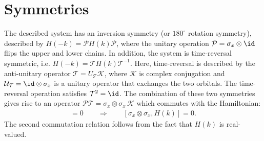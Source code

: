 \section{Symmetries}
The described system has an inversion symmetry (or $180^\circ$ rotation symmetry), described by $H(-k) = \mathcal{P} H(k) \mathcal{P}$, where the unitary operation $\mathcal{P} = \sigma_x \otimes \id$ flips the upper and lower chains.
In addition, the system is time-reversal symmetric, i.e. $H(-k)=\mathcal{T} H(k) \mathcal{T}^{-1}$.
Here, time-reversal is described by the anti-unitary operator $\mathcal{T}=U_\mathcal{T} \mathcal{K}$, where $\mathcal{K}$ is complex conjugation and $\mathcal{U}_\mathcal{T} = \id \otimes \sigma_x$ is a unitary operator that exchanges the two orbitals.
The time-reversal operation satisfies $\mathcal{T}^2 = \id$.
The combination of these two symmetries gives rise to an operator $\mathcal{P}\mathcal{T} = \sigma_x \otimes \sigma_x \, \mathcal{K}$ which commutes with the Hamiltonian:
\begin{align}
    [\mathcal{P}\mathcal{T}, H(k)] = 0\qquad \Rightarrow \qquad [\sigma_x \otimes \sigma_x, H(k)]= 0.
\end{align}
The second commutation relation follows from the fact that $H(k)$ is real-valued.


